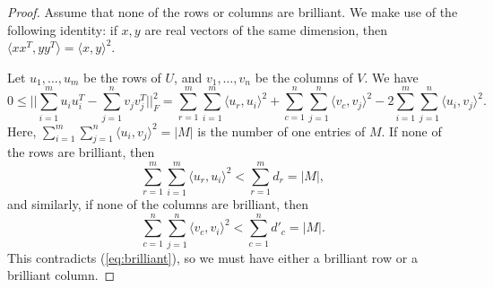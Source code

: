\documentclass[11pt]{amsart}
\theoremstyle{plain}
\theoremstyle{definition}
\begin{document}
\begin{proof}
Assume that none of the rows or columns are brilliant. We make use of the following identity: if $x,y$ are real vectors of the same dimension, then $\langle xx^T,yy^T\rangle=\langle x,y\rangle^2$.

Let $u_1,\dots,u_m$ be the rows of $U$, and $v_1,\dots,v_n$ be the columns of $V$. We have
\begin{equation}\label{eq:brilliant}
    0\leq || \sum_{i=1}^m u_iu_i^T-\sum_{j=1}^n v_jv_j^T||_F^2=\sum_{r=1}^{m}\sum_{i=1}^m \langle u_r,u_i\rangle^2+\sum_{c=1}^{n}\sum_{j=1}^n \langle v_c,v_j\rangle^2-2\sum_{i=1}^{m}\sum_{j=1}^n\langle u_i,v_j\rangle^2.
\end{equation}
Here, $\sum_{i=1}^{m}\sum_{j=1}^n\langle u_i,v_j\rangle^2=|M|$ is the number of one entries of $M$. If none of the rows are brilliant, then $$\sum_{r=1}^{m}\sum_{i=1}^m \langle u_r,u_i\rangle^2<\sum_{r=1}^m d_r=|M|,$$
and similarly, if  none of the columns are brilliant, then 
$$\sum_{c=1}^{n}\sum_{j=1}^n \langle v_c,v_i\rangle^2<\sum_{c=1}^n d'_c=|M|.$$
This contradicts (\ref{eq:brilliant}), so we must have either a brilliant row or a brilliant column.
\end{proof}
\end{document}
